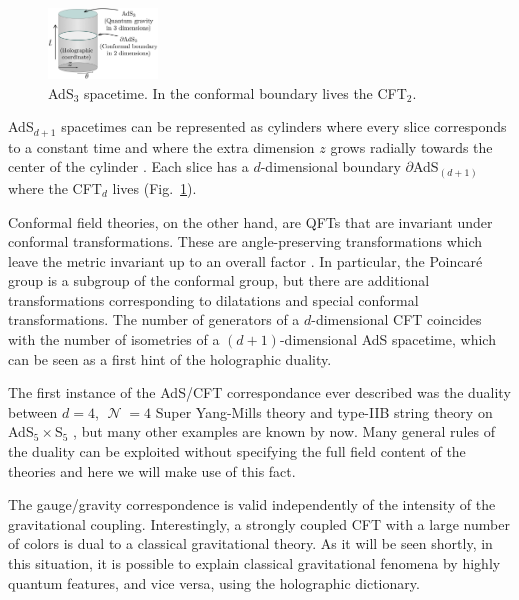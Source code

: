 \documentclass[twocolumn]{revtex4}
\DeclareMathOperator{\calN}{\mathcal{N}}
\begin{document}

\begin{figure}
    \centering
    \includegraphics[width=0.26\textwidth]{../imatges/AdS_Cylindric.png}
\caption{AdS$_3$ spacetime. In the conformal boundary lives the CFT$_2$.}
\label{fig:AdS}
\end{figure}

AdS$_{d+1}$ spacetimes can be represented as cylinders where every slice corresponds to a constant time and where the extra dimension $z$ grows radially towards the center of the cylinder \cite{hawking_large_2008}. Each slice has a $d$-dimensional boundary $\partial$AdS$_{(d+1)}$ where the CFT$_d$ lives (Fig.~\ref{fig:AdS}).

Conformal field theories, on the other hand, are QFTs that are invariant under conformal transformations. These are angle-preserving transformations which leave the metric invariant up to an overall factor \cite{ginsparg_applied_1988}. In particular, the Poincar\'e group is a subgroup of the conformal group, but there are additional transformations corresponding to dilatations and special conformal transformations. The number of generators of a $d$-dimensional CFT coincides with the number of isometries of a $(d+1)$-dimensional AdS spacetime, which can be seen as a first hint of the holographic duality.

The first instance of the AdS/CFT correspondance ever described was the duality between $d=4$, $\calN=4$ Super Yang-Mills theory and type-IIB string theory on AdS$_5 \times $S$_5$ \cite{maldacena_large_1999}, but many other examples are known by now. Many general rules of the duality can be exploited without specifying the full field content of the theories and here we will make use of this fact.

The gauge/gravity correspondence is valid independently of the intensity of the gravitational coupling. Interestingly, a strongly coupled CFT with a large number of colors is dual to a classical gravitational theory. As it will be seen shortly, in this situation, it is possible to explain classical gravitational fenomena by highly quantum features, and vice versa, using the holographic dictionary.
\end{document}
